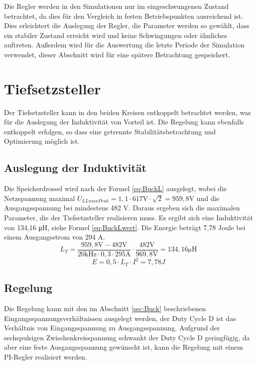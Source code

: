 Die Regler werden in den Simulationen nur im eingeschwungenen Zustand betrachtet, da dies für den Vergleich in festen Betriebspunkten ausreichend ist. Dies erleichtert die Auslegung der Regler, die Parameter werden so gewählt, dass ein stabiler Zustand erreicht wird und keine Schwingungen oder ähnliches auftreten. Außerdem wird für die Auswertung die letzte Periode der Simulation verwendet, dieser Abschnitt wird für eine spätere Betrachtung gespeichert.

\section{Tiefsetzsteller}
Der Tiefsetzsteller kann in den beiden Kreisen entkoppelt betrachtet werden, was für die Auslegung der Induktivität von Vorteil ist. Die Regelung kann ebenfalls entkoppelt erfolgen, so dass eine getrennte Stabilitätsbetrachtung und Optimierung möglich ist. 
	\subsection{Auslegung der Induktivität}
	Die Speicherdrossel wird nach der Formel \ref{eq:BuckL} ausgelegt, wobei die Netzspannung maximal $U_{LLmaxPeak}=1,1 \cdot 617 \si{\V} \cdot \sqrt{2}=959,8 \si{\V}$ und die Ausgangsspannung bei mindestens 482 \si{\V}. Daraus ergeben sich die maximalen Parameter, die der Tiefsetzsteller realisieren muss. Es ergibt sich eine Induktivität von 134,16 \si{\micro \henry}, siehe Formel \ref{eq:BuckLwert}. Die Energie beträgt 7,78 Joule bei einem Ausgangsstrom von 294 A. 
	\begin{equation}
	\label{eq:BuckLwert}
	L_{T}=\dfrac{959,8\si{\V} - 482 \si{\V}}{20 \si{\kilo \hertz}\cdot 0,3 \cdot 295 \si{\ampere}}\cdot \dfrac{482 \si{\V}}{969,8 \si{\V}}= 134,16 \si{\micro \henry} 
	\end{equation}
	\begin{equation}
		E=0,5 \cdot L_{T} \cdot I^{2} = 7,78 J
	\end{equation}
	\subsection{Regelung}
	Die Regelung kann mit den im Abschnitt \ref{sec:Buck} beschriebenen Eingangsspannungsverhältnissen ausgelegt werden, der Duty Cycle \gls{D} ist das Verhältnis von Eingangsspannung zu Ausgangsspannung. Aufgrund der sechspulsigen Zwischenkreisspannung schwankt der Duty Cycle \gls{D} geringfügig, da aber eine feste Ausgangsspannung gewünscht ist, kann die Regelung mit einem PI-Regler realisiert werden. 



